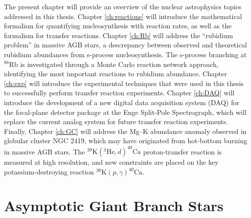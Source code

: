 The present chapter will provide an overview of the nuclear astrophysics topics addressed in this thesis. Chapter \ref{ch:reactions} will introduce the mathematical formalism for quantifying nucleosynthesis with reaction rates, as well as the formalism for transfer reactions. Chapter \ref{ch:Rb} will address the ``rubidium problem'' in massive AGB stars, a descrepancy between observed and theoretical rubidium abundances from s-process nucleosynthesis. The s-process branching at $^{86}$Rb is investigated through a Monte Carlo reaction network approach, identifying the most important reactions to rubidium abundance.
Chapter \ref{ch:exp} will introduce the experimental techniques that were used in this thesis to successfully perform transfer reaction experiments. Chapter \ref{ch:DAQ} will introduce the development of a new digital data acquisition system (DAQ) for the focal-plane detector package at the Enge Split-Pole Spectrograph, which will replace the current analog system for future transfer reaction experiments. Finally, Chapter \ref{ch:GC} will address the Mg--K abundance anomaly observed in globular cluster NGC 2419, which may have originated from hot-bottom burning in massive AGB stars. The $^{39}\mathrm{K}(^{3}\mathrm{He},d)^{40}\mathrm{Ca}$ proton-transfer reaction is measured at high resolution, and new constraints are placed on the key potassium-destroying reaction $^{39}\mathrm{K}(p,\gamma)^{40}\mathrm{Ca}$.


\section{Asymptotic Giant Branch Stars}

